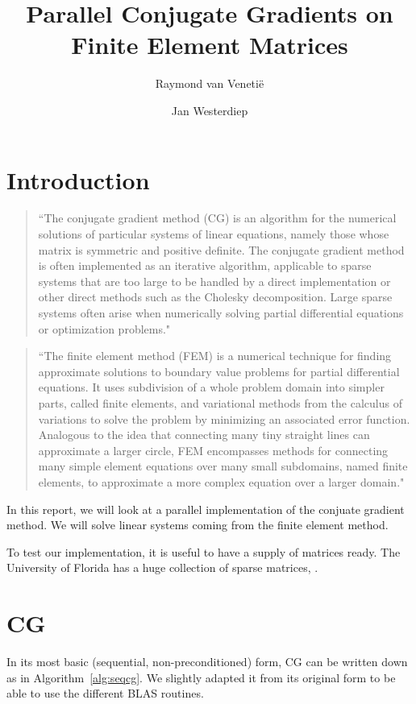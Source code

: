 \documentclass[11pt]{amsart}
\theoremstyle{definition}
\begin{document}
\title{Parallel Conjugate Gradients on Finite Element Matrices}
\author{Raymond van Veneti\"e \and Jan Westerdiep}
\maketitle

\section{Introduction}
\begin{quote}
``The conjugate gradient method (CG) is an algorithm for the numerical solutions of particular systems of linear equations, namely those whose matrix is symmetric and positive definite. The conjugate gradient method is often implemented as an iterative algorithm, applicable to sparse systems that are too large to be handled by a direct implementation or other direct methods such as the Cholesky decomposition. Large sparse systems often arise when numerically solving partial differential equations or optimization problems." \cite{wiki:cg}
\end{quote}

\begin{quote}
``The finite element method (FEM) is a numerical technique for finding approximate solutions to boundary value problems for partial differential equations. It uses subdivision of a whole problem domain into simpler parts, called finite elements, and variational methods from the calculus of variations to solve the problem by minimizing an associated error function. Analogous to the idea that connecting many tiny straight lines can approximate a larger circle, FEM encompasses methods for connecting many simple element equations over many small subdomains, named finite elements, to approximate a more complex equation over a larger domain." \cite{wiki:fem}
\end{quote}

In this report, we will look at a parallel implementation of the conjuate gradient method. We will solve linear systems coming from the finite element method.

To test our implementation, it is useful to have a supply of matrices ready. The University of Florida has a huge collection of sparse matrices, \cite{uniflo}.

\section{CG}
In its most basic (sequential, non-preconditioned) form, CG can be written down as in Algorithm~\ref{alg:seqcg}. \cite[Alg.~4.8]{biss04} We slightly adapted it from its original form to be able to use the different BLAS routines.
\end{document}

